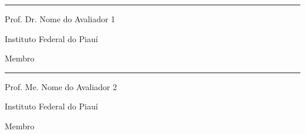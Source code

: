 \begin{folhadeaprovacao}
\begin{center}
\vspace{1cm}

\rule{10cm}{0.4pt}

Prof. Dr. Nome do Avaliador 1

Instituto Federal do Piauí

Membro

\vspace{1cm}

\rule{10cm}{0.4pt}

Prof. Me. Nome do Avaliador 2

Instituto Federal do Piauí

Membro

\end{center}

\end{folhadeaprovacao}